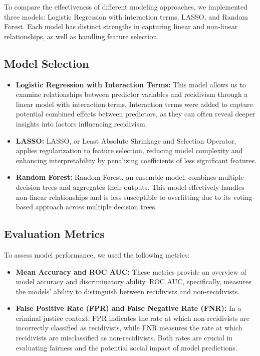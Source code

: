 \documentclass[12pt]{article}
\begin{document}
To compare the effectiveness of different modeling approaches, we implemented three models: Logistic Regression with interaction terms, LASSO, and Random Forest. Each model has distinct strengths in capturing linear and non-linear relationships, as well as handling feature selection.

\subsection{Model Selection}
\begin{itemize}
    \item \textbf{Logistic Regression with Interaction Terms:} This model allows us to examine relationships between predictor variables and recidivism through a linear model with interaction terms. Interaction terms were added to capture potential combined effects between predictors, as they can often reveal deeper insights into factors influencing recidivism.
    \item \textbf{LASSO:} LASSO, or Least Absolute Shrinkage and Selection Operator, applies regularization to feature selection, reducing model complexity and enhancing interpretability by penalizing coefficients of less significant features.
    \item \textbf{Random Forest:} Random Forest, an ensemble model, combines multiple decision trees and aggregates their outputs. This model effectively handles non-linear relationships and is less susceptible to overfitting due to its voting-based approach across multiple decision trees.
\end{itemize}

\subsection{Evaluation Metrics}
To assess model performance, we used the following metrics:
\begin{itemize}
    \item \textbf{Mean Accuracy and ROC AUC:} These metrics provide an overview of model accuracy and discriminatory ability. ROC AUC, specifically, measures the models’ ability to distinguish between recidivists and non-recidivists.
    \item \textbf{False Positive Rate (FPR) and False Negative Rate (FNR):} In a criminal justice context, FPR indicates the rate at which non-recidivists are incorrectly classified as recidivists, while FNR measures the rate at which recidivists are misclassified as non-recidivists. Both rates are crucial in evaluating fairness and the potential social impact of model predictions.
\end{itemize}
\end{document}
